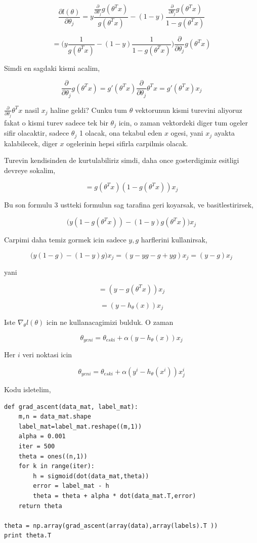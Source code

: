 \documentclass[12pt,fleqn]{article}\usepackage{../common}
\begin{document}
$$ 
\frac{\partial l(\theta)}{\partial \theta_j} =
y 
\frac{\frac{\partial }{\partial \theta_j}g(\theta^Tx) }{g(\theta^Tx)} 
-
(1-y) 
\frac{\frac{\partial }{\partial \theta_j}g(\theta^Tx) }{1-g(\theta^Tx)} 
$$

$$ 
= \big(
y 
\frac{1}{g(\theta^Tx)} 
-
(1-y) 
\frac{1}{1-g(\theta^Tx)} 
\big)
\frac{\partial }{\partial \theta_j}g(\theta^Tx)
$$

Simdi en sagdaki kismi acalim,

$$ 
\frac{\partial }{\partial \theta_j}g(\theta^Tx) 
= g'(\theta^Tx) \frac{\partial }{\partial \theta_j} \theta^Tx 
= g'(\theta^Tx) x_j 
 $$

$\frac{\partial }{\partial \theta_j} \theta^Tx$ nasil $x_j$ haline
geldi?  Cunku tum $\theta$ vektorunun kismi turevini aliyoruz fakat o
kismi turev sadece tek bir $\theta_j$ icin, o zaman vektordeki diger
tum ogeler sifir olacaktir, sadece $\theta_j$ 1 olacak, ona tekabul
eden $x$ ogesi, yani $x_j$ ayakta kalabilecek, diger $x$ ogelerinin
hepsi sifirla carpilmis olacak.

Turevin kendisinden de kurtulabiliriz simdi, daha once gosterdigimiz esitligi
devreye sokalim,

$$ 
= g(\theta^Tx)(1-g(\theta^Tx)) x_j 
$$

Bu son formulu 3 ustteki formulun sag tarafina geri koyarsak, ve
basitlestirirsek,

$$
\big(
y(1-g(\theta^Tx)) - (1-y)g(\theta^T x)
\big) x_j
 $$

Carpimi daha temiz gormek icin sadece $y,g$ harflerini kullanirsak,

$$
\big(y(1-g) - (1-y)g \big) x_j =
(y - yg - g + yg)x_j = (y - g)x_j
 $$

yani

$$
= (y - g(\theta^Tx))x_j
$$

$$
= (y - h_\theta(x))x_j
$$

Iste $\nabla_\theta l(\theta)$ icin ne kullanacagimizi bulduk. O zaman

$$ \theta_{yeni} = \theta_{eski} + \alpha (y - h_\theta(x))x_j $$

Her $i$ veri noktasi icin

$$ \theta_{yeni} = \theta_{eski} + \alpha (y^{i} - h_\theta(x^{i}))x^{i}_j $$

Kodu isletelim,

\begin{verbatim}
def grad_ascent(data_mat, label_mat):
    m,n = data_mat.shape
    label_mat=label_mat.reshape((m,1))
    alpha = 0.001
    iter = 500
    theta = ones((n,1))
    for k in range(iter):   
        h = sigmoid(dot(data_mat,theta))
        error = label_mat - h
        theta = theta + alpha * dot(data_mat.T,error) 
    return theta

theta = np.array(grad_ascent(array(data),array(labels).T ))
print theta.T
\end{verbatim}
\end{document}
